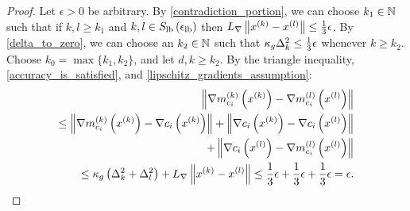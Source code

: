 


\begin{proof}
Let $\epsilon > 0$ be arbitrary.
By \cref{contradiction_portion}, we can choose $k_1 \in \mathbb N$ such that if $k, l \ge k_1$ and
$k, l \in {S_{\textrm{lb}}\left(\epsilon_{\textrm{lb}}\right)}$ then ${L_{\nabla}} \left\|x^{(k)} - {x^{(l)}} \right\| \le \frac 1 3 \epsilon$.
By \cref{delta_to_zero}, we can choose an $k_2 \in \mathbb N$ such that $\kappa_g \Delta_k^2 \le \frac 1 3 \epsilon $ whenever $k \ge k_2$.
Choose $k_0 = \max\{k_1, k_2\}$, and let $d, k \ge k_2$.
By the triangle inequality, \cref{accuracy_is_satisfied}, and \cref{lipschitz_gradients_assumption}:
\begin{align*}
\left\|\nabla {{m}^{(k)}_{c_i}}\left(x^{(k)}\right) - \nabla {{m}^{(l)}_{c_i}}\left({x^{(l)}}\right) \right\| \\
\le 
\left\|\nabla {{m}^{(k)}_{c_i}}\left(x^{(k)}\right) - \nabla c_i\left(x^{(k)}\right) \right\|
+ \left\|\nabla c_i\left(x^{(k)}\right) - \nabla c_i\left({x^{(l)}}\right)\right\| \\
+ \left \| \nabla c_i\left({x^{(l)}}\right) - \nabla {{m}^{(l)}_{c_i}}\left({x^{(l)}}\right) \right \| \\
\le \kappa_g \left(\Delta_k^2 + \Delta_l^2\right) + {L_{\nabla}} \left\|x^{(k)} - {x^{(l)}} \right\|
\le \frac 1 3 \epsilon + \frac 1 3 \epsilon + \frac 1 3 \epsilon = \epsilon.
\end{align*}
\end{proof}





